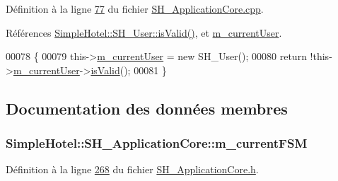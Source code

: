 Définition à la ligne \hyperlink{SH__ApplicationCore_8cpp_source_l00077}{77} du fichier \hyperlink{SH__ApplicationCore_8cpp_source}{S\-H\-\_\-\-Application\-Core.\-cpp}.



Références \hyperlink{classSimpleHotel_1_1SH__User_a8b60e67bc474ee97367f36d0278721ca}{Simple\-Hotel\-::\-S\-H\-\_\-\-User\-::is\-Valid()}, et \hyperlink{classSimpleHotel_1_1SH__ApplicationCore_afd7cbbb3267dd91e453bfc85211437c7}{m\-\_\-current\-User}.


\begin{DoxyCode}
00078 \{
00079     this->\hyperlink{classSimpleHotel_1_1SH__ApplicationCore_afd7cbbb3267dd91e453bfc85211437c7}{m\_currentUser} = \textcolor{keyword}{new} SH\_User();
00080     \textcolor{keywordflow}{return} !this->\hyperlink{classSimpleHotel_1_1SH__ApplicationCore_afd7cbbb3267dd91e453bfc85211437c7}{m\_currentUser}->\hyperlink{classSimpleHotel_1_1SH__User_a8b60e67bc474ee97367f36d0278721ca}{isValid}();
00081 \}
\end{DoxyCode}


\subsection{Documentation des données membres}
\hypertarget{classSimpleHotel_1_1SH__ApplicationCore_adc77b4d9a57cb898b672f344c9596190}{
\subsubsection[{m\-\_\-current\-F\-S\-M}]{\setlength{\rightskip}{0pt plus 5cm}Simple\-Hotel\-::\-S\-H\-\_\-\-Application\-Core\-::m\-\_\-current\-F\-S\-M\hspace{0.3cm}{\ttfamily [private]}}}\label{classSimpleHotel_1_1SH__ApplicationCore_adc77b4d9a57cb898b672f344c9596190}


Définition à la ligne \hyperlink{SH__ApplicationCore_8h_source_l00268}{268} du fichier \hyperlink{SH__ApplicationCore_8h_source}{S\-H\-\_\-\-Application\-Core.\-h}.



